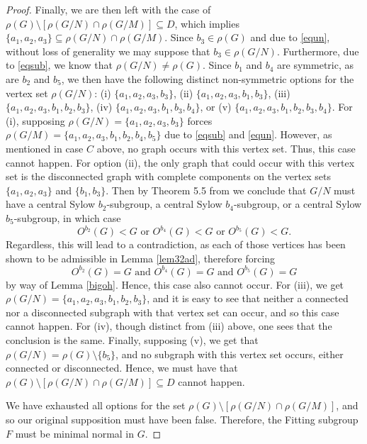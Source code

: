 \documentclass[11pt]{amsart}
\theoremstyle{definition}
\theoremstyle{remark}
\numberwithin{equation}{section}
\begin{document}
\begin{proof}
Finally, we are then left with the case of $\rho(G)\setminus[\rho(G/N)\cap\rho(G/M)]\subseteq D$, which implies $\{a_1,a_2,a_3\}\subseteq\rho(G/N)\cap\rho(G/M)$. Since $b_3\in\rho(G)$ and due to \eqref{equn}, without loss of generality we may suppose that $b_3\in\rho(G/N)$. Furthermore, due to \eqref{eqsub}, we know that $\rho(G/N)\neq\rho(G)$. Since $b_1$ and $b_4$ are symmetric, as are $b_2$ and $b_5$, we then have the following distinct non-symmetric options for the vertex set $\rho(G/N)$: (i) $\{a_1,a_2,a_3,b_3\}$, (ii) $\{a_1,a_2,a_3,b_1,b_3\}$, (iii) $\{a_1,a_2,a_3,b_1,b_2,b_3\}$, (iv) $\{a_1,a_2,a_3,b_1,b_3,b_4\}$, or (v) $\{a_1,a_2,a_3,b_1,b_2,b_3,b_4\}$. For (i), supposing $\rho(G/N)=\{a_1,a_2,a_3,b_3\}$ forces $\rho(G/M)=\{a_1,a_2,a_3,b_1,b_2,b_4,b_5\}$ due to \eqref{eqsub} and \eqref{equn}. However, as mentioned in case $C$ above, no graph occurs with this vertex set. Thus, this case cannot happen. For option (ii), the only graph that could occur with this vertex set is the disconnected graph with complete components on the vertex sets $\{a_1,a_2,a_3\}$ and $\{b_1,b_3\}$. Then by Theorem 5.5 from \cite{L} we conclude that $G/N$ must have a central Sylow $b_2$-subgroup, a central Sylow $b_4$-subgroup, or a central Sylow $b_5$-subgroup, in which case
$$
O^{b_2}(G)<G\text{~or~}O^{b_4}(G)<G\text{~or~}O^{b_5}(G)<G.
$$
Regardless, this will lead to a contradiction, as each of those vertices has been shown to be admissible in Lemma \ref{lem32ad}, therefore forcing
$$
O^{b_2}(G)=G\text{~and~}O^{b_4}(G)=G\text{~and~}O^{b_5}(G)=G
$$
by way of Lemma \ref{bigoh}. Hence, this case also cannot occur. For (iii), we get $\rho(G/N)=\{a_1,a_2,a_3,b_1,b_2,b_3\}$, and it is easy to see that neither a connected nor a disconnected subgraph with that vertex set can occur, and so this case cannot happen. For (iv), though distinct from (iii) above, one sees that the conclusion is the same. Finally, supposing (v), we get that $\rho(G/N)=\rho(G)\setminus\{b_5\}$, and no subgraph with this vertex set occurs, either connected or disconnected. Hence, we must have that $\rho(G)\setminus[\rho(G/N)\cap\rho(G/M)]\subseteq D$ cannot happen.

We have exhausted all options for the set $\rho(G)\setminus[\rho(G/N)\cap\rho(G/M)]$, and so our original supposition must have been false. Therefore, the Fitting subgroup $F$ must be minimal normal in $G$.
\end{proof}
\end{document}
